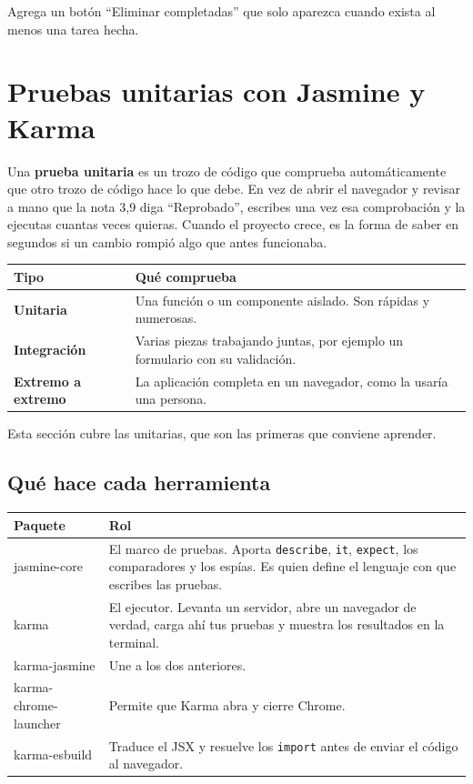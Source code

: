 \documentclass[11pt,a4paper]{article}
\newcommand{\cmd}[1]{\texttt{\color{reactdark}#1}}
\begin{document}
\begin{ejercicio}[3]
Agrega un botón ``Eliminar completadas'' que solo aparezca cuando exista al menos una tarea hecha.
\end{ejercicio}

\section{Pruebas unitarias con Jasmine y Karma}\label{sec:pruebas}

Una \textbf{prueba unitaria} es un trozo de código que comprueba automáticamente que otro trozo de código hace lo que debe. En vez de abrir el navegador y revisar a mano que la nota 3,9 diga ``Reprobado'', escribes una vez esa comprobación y la ejecutas cuantas veces quieras. Cuando el proyecto crece, es la forma de saber en segundos si un cambio rompió algo que antes funcionaba.

\begin{center}
\small
\begin{tabular}{>{\bfseries}l p{10.5cm}}
\toprule
Tipo & Qué comprueba \\
\midrule
Unitaria & Una función o un componente aislado. Son rápidas y numerosas. \\
Integración & Varias piezas trabajando juntas, por ejemplo un formulario con su validación. \\
Extremo a extremo & La aplicación completa en un navegador, como la usaría una persona. \\
\bottomrule
\end{tabular}
\end{center}

Esta sección cubre las unitarias, que son las primeras que conviene aprender.

\subsection{Qué hace cada herramienta}

\begin{center}
\small
\begin{tabular}{>{\ttfamily}l p{10cm}}
\toprule
\textrm{\textbf{Paquete}} & \textbf{Rol} \\
\midrule
jasmine-core & El marco de pruebas. Aporta \cmd{describe}, \cmd{it}, \cmd{expect}, los comparadores y los espías. Es quien define el lenguaje con que escribes las pruebas. \\
karma & El ejecutor. Levanta un servidor, abre un navegador de verdad, carga ahí tus pruebas y muestra los resultados en la terminal. \\
karma-jasmine & Une a los dos anteriores. \\
karma-chrome-launcher & Permite que Karma abra y cierre Chrome. \\
karma-esbuild & Traduce el JSX y resuelve los \cmd{import} antes de enviar el código al navegador. \\
\bottomrule
\end{tabular}
\end{center}
\end{document}
